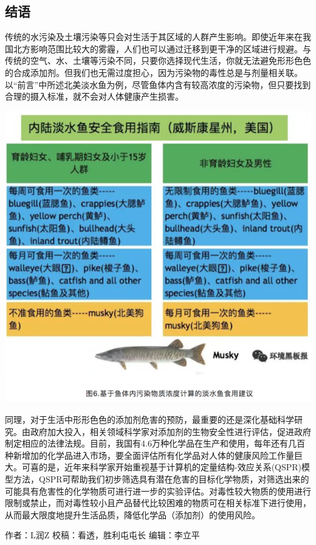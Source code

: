 \documentclass[]{book}
\begin{document}
\subsection{结语}\label{-2}

传统的水污染及土壤污染等只会对生活于其区域的人群产生影响。即使近年来在我国北方影响范围比较大的雾霾，人们也可以通过迁移到更干净的区域进行规避。与传统的空气、水、土壤等污染不同，只要你选择现代生活，你就无法避免形形色色的合成添加剂。但我们也无需过度担心，因为污染物的毒性总是与剂量相关联。以``前言''中所述北美淡水鱼为例，尽管鱼体内含有较高浓度的污染物，但只要找到合理的摄入标准，就不会对人体健康产生损害。

\includegraphics[width=8.33in]{images/epc6}

同理，对于生活中形形色色的添加剂危害的预防，最重要的还是深化基础科学研究。由政府加大投入，相关领域科学家对添加剂的生物安全性进行评估，促进政府制定相应的法律法规。目前，我国有4.6万种化学品在生产和使用，每年还有几百种新增加的化学品进入市场，要全面评估所有化学品对人体的健康风险工作量巨大。可喜的是，近年来科学家开始重视基于计算机的定量结构-效应关系(QSPR)模型方法，QSPR可帮助我们初步筛选具有潜在危害的目标化学物质，对筛选出来的可能具有危害性的化学物质可进行进一步的实验评估。对毒性较大物质的使用进行限制或禁止，而对毒性较小且产品替代比较困难的物质可在相关标准下进行使用，从而最大限度地提升生活品质，降低化学品（添加剂）的使用风险。

作者：L润Z 校稿：看透，胜利屯屯长 编辑：李立平
\end{document}

